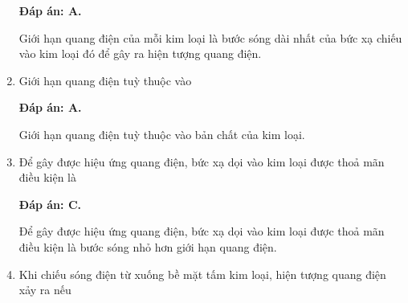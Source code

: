 \begin{enumerate}[label=\bfseries Câu \arabic*:]
	\loigiai
	{		\textbf{Đáp án: A.}
		
Giới hạn quang điện của mỗi kim loại là  bước sóng dài nhất của bức xạ chiếu vào kim loại đó để gây ra hiện tượng quang điện. 
		
	}
	
\item {} 
	
	\cauhoi
	{Giới hạn quang điện tuỳ thuộc vào
	}
	
	\loigiai
	{		\textbf{Đáp án: A.}
		
Giới hạn quang điện tuỳ thuộc vào bản chất của kim loại. 
		
	}
	
	\item {} 
	
	\cauhoi
	{Để gây được hiệu ứng quang điện, bức xạ dọi vào kim loại được thoả mãn điều kiện là 
	}
	
	\loigiai
	{		\textbf{Đáp án: C.}
		
Để gây được hiệu ứng quang điện, bức xạ dọi vào kim loại được thoả mãn điều kiện là bước sóng nhỏ hơn giới hạn quang điện. 
		
	}
	
	\item {} 
	
	\cauhoi
	{Khi chiếu sóng điện từ xuống bề mặt tấm kim loại, hiện tượng quang điện xảy ra nếu
	}
	

\end{enumerate}
